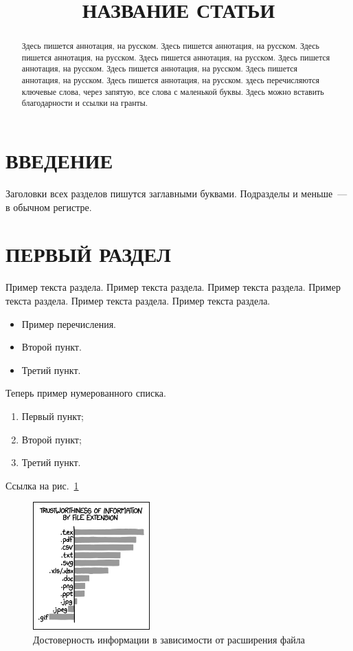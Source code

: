 \documentclass[intlimits,twoside,a4paper,11pt]{article}
\title[Название статьи]{НАЗВАНИЕ СТАТЬИ}
\affiliation{1}{СПбГУ}
\affiliation{2}{СПбЭТУ}
\begin{document}
\maketitle

\begin{abstract}
Здесь пишется аннотация, на русском.
Здесь пишется аннотация, на русском.
Здесь пишется аннотация, на русском.
Здесь пишется аннотация, на русском.
Здесь пишется аннотация, на русском.
Здесь пишется аннотация, на русском.
Здесь пишется аннотация, на русском.
Здесь пишется аннотация, на русском.
\keywords здесь перечисляются ключевые слова, через запятую, все слова с маленькой буквы.
\autocitationexample
\acknowledgements Здесь можно вставить благодарности и ссылки на гранты.
\end{abstract}

\section{ВВЕДЕНИЕ}
Заголовки всех разделов пишутся заглавными буквами. Подразделы и меньше~--- в обычном регистре.

\section{ПЕРВЫЙ РАЗДЕЛ}
Пример текста раздела. Пример текста раздела. Пример текста раздела. Пример текста раздела. Пример текста раздела. Пример текста раздела.
\begin{itemize}
\item Пример перечисления.
\item Второй пункт.
\item Третий пункт.
\end{itemize}

Теперь пример нумерованного списка.
\begin{enumerate}
\item Первый пункт;
\item Второй пункт;
\item Третий пункт.
\end{enumerate}
Ссылка на рис.~\ref{fig-example}

\begin{figure}[htb]
\centering
\includegraphics[width=0.4\textwidth]{xkcd1301.png}
\caption{Достоверность информации в зависимости от расширения файла} \label{fig-example}
\end{figure}
\end{document}
